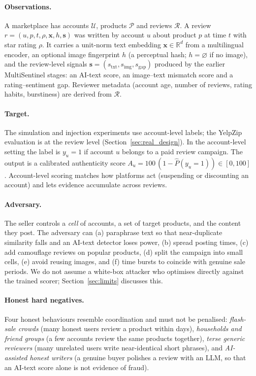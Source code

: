 \documentclass[pdflatex,sn-basic]{sn-jnl}
\theoremstyle{thmstyleone}
\theoremstyle{thmstylethree}
\begin{document}
\paragraph{Observations.} A marketplace has accounts $\mathcal U$, products $\mathcal P$ and reviews $\mathcal R$. A review $r=(u,p,t,\rho,\mathbf x,h,\mathbf s)$ was written by account $u$ about product $p$ at time $t$ with star rating $\rho$. It carries a unit-norm text embedding $\mathbf x\in\mathbb R^d$ from a multilingual encoder, an optional image fingerprint $h$ (a perceptual hash; $h=\varnothing$ if no image), and the review-level signals $\mathbf s=(s_{\mathrm{txt}},s_{\mathrm{img}},s_{\mathrm{gap}})$ produced by the earlier MultiSentinel stages: an AI-text score, an image--text mismatch score and a rating--sentiment gap. Reviewer metadata (account age, number of reviews, rating habits, burstiness) are derived from $\mathcal R$.

\paragraph{Target.} The simulation and injection experiments use account-level labels; the YelpZip evaluation is at the review level (Section~\ref{sec:real_design}). In the account-level setting the label is $y_u=1$ if account $u$ belongs to a paid review campaign. The output is a calibrated authenticity score $A_u=100\,(1-\hat P(y_u=1))\in[0,100]$. Account-level scoring matches how platforms act (suspending or discounting an account) and lets evidence accumulate across reviews.

\paragraph{Adversary.} The seller controls a \emph{cell} of accounts, a set of target products, and the content they post. The adversary can (a) paraphrase text so that near-duplicate similarity falls and an AI-text detector loses power, (b) spread posting times, (c) add camouflage reviews on popular products, (d) split the campaign into small cells, (e) avoid reusing images, and (f) time bursts to coincide with genuine sale periods. We do not assume a white-box attacker who optimises directly against the trained scorer; Section~\ref{sec:limits} discusses this.

\paragraph{Honest hard negatives.} Four honest behaviours resemble coordination and must not be penalised: \emph{flash-sale crowds} (many honest users review a product within days), \emph{households and friend groups} (a few accounts review the same products together), \emph{terse generic reviewers} (many unrelated users write near-identical short phrases), and \emph{AI-assisted honest writers} (a genuine buyer polishes a review with an LLM, so that an AI-text score alone is not evidence of fraud).
\end{document}
